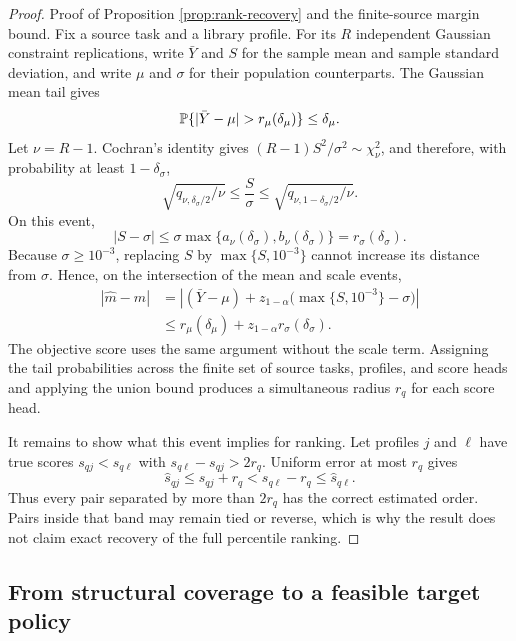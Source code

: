 \begin{proof}{Proof of Proposition \ref{prop:rank-recovery} and the
finite-source margin bound.}
Fix a source task and a library profile.  For its $R$ independent Gaussian
constraint replications, write $\bar Y$ and $S$ for the sample mean and sample
standard deviation, and write $\mu$ and $\sigma$ for their population
counterparts.  The Gaussian mean tail gives
\[
 \Prob\{ |\bar Y-\mu|>r_\mu(\delta_\mu)\}
 \le \delta_\mu.
\]
Let $\nu=R-1$.  Cochran's identity gives
$(R-1)S^2/\sigma^2\sim\chi^2_\nu$, and therefore, with probability at least
$1-\delta_\sigma$,
\[
 \sqrt{q_{\nu,\delta_\sigma/2}/\nu}
 \le \frac{S}{\sigma}
 \le \sqrt{q_{\nu,1-\delta_\sigma/2}/\nu}.
\]
On this event,
\[
 |S-\sigma|
 \le \sigma\max\{a_\nu(\delta_\sigma),
                         b_\nu(\delta_\sigma)\}
 =r_\sigma(\delta_\sigma).
\]
Because $\sigma\ge10^{-3}$, replacing $S$ by
$\max\{S,10^{-3}\}$ cannot increase its distance from $\sigma$.  Hence, on
the intersection of the mean and scale events,
\begin{align*}
 |\widehat m-m|
 &=\left| (\bar Y-\mu)
       +z_{1-\alpha}\bigl(\max\{S,10^{-3}\}-\sigma\bigr)\right|\\
 &\le r_\mu(\delta_\mu)
      +z_{1-\alpha}r_\sigma(\delta_\sigma).
\end{align*}
The objective score uses the same argument without the scale term.  Assigning
the tail probabilities across the finite set of source tasks, profiles, and
score heads and applying the union bound produces a simultaneous radius $r_q$
for each score head.

It remains to show what this event implies for ranking.  Let profiles $j$ and
$\ell$ have true scores $s_{qj}<s_{q\ell}$ with
$s_{q\ell}-s_{qj}>2r_q$.  Uniform error at most $r_q$ gives
\[
 \widehat s_{qj}
 \le s_{qj}+r_q
 < s_{q\ell}-r_q
 \le \widehat s_{q\ell}.
\]
Thus every pair separated by more than $2r_q$ has the correct estimated order.
Pairs inside that band may remain tied or reverse, which is why the result
does not claim exact recovery of the full percentile ranking.
\end{proof}

\subsection{From structural coverage to a feasible target policy}
\label{app:proof-aligned}

